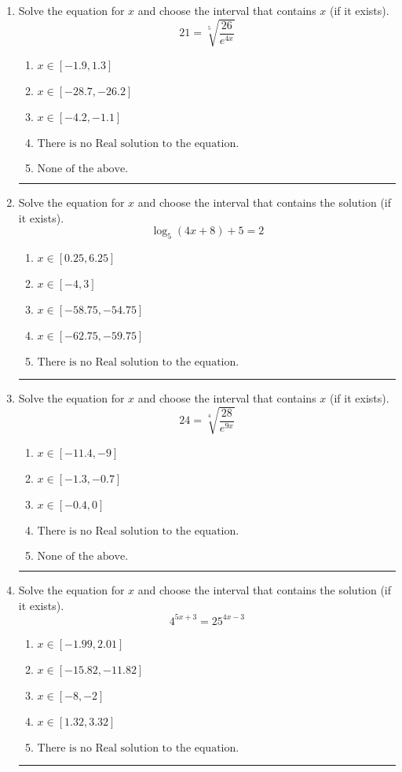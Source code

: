 \documentclass[14pt]{extbook}
\newcommand{\litem}[1]{\item#1\hspace*{-1cm}\rule{\textwidth}{0.4pt}}
\begin{document}
\begin{enumerate}
{\begin{enumerate}[label=\Alph*.]
\end{enumerate} }
\litem{
 Solve the equation for $x$ and choose the interval that contains $x$ (if it exists).\[  21 = \sqrt[5]{\frac{26}{e^{4x}}} \]\begin{enumerate}[label=\Alph*.]
\item \( x \in [-1.9, 1.3] \)
\item \( x \in [-28.7, -26.2] \)
\item \( x \in [-4.2, -1.1] \)
\item \( \text{There is no Real solution to the equation.} \)
\item \( \text{None of the above.} \)

\end{enumerate} }
\litem{
Solve the equation for $x$ and choose the interval that contains the solution (if it exists).\[ \log_{5}{(4x+8)}+5 = 2 \]\begin{enumerate}[label=\Alph*.]
\item \( x \in [0.25, 6.25] \)
\item \( x \in [-4, 3] \)
\item \( x \in [-58.75, -54.75] \)
\item \( x \in [-62.75, -59.75] \)
\item \( \text{There is no Real solution to the equation.} \)

\end{enumerate} }
\litem{
 Solve the equation for $x$ and choose the interval that contains $x$ (if it exists).\[  24 = \sqrt[4]{\frac{28}{e^{9x}}} \]\begin{enumerate}[label=\Alph*.]
\item \( x \in [-11.4, -9] \)
\item \( x \in [-1.3, -0.7] \)
\item \( x \in [-0.4, 0] \)
\item \( \text{There is no Real solution to the equation.} \)
\item \( \text{None of the above.} \)

\end{enumerate} }
\litem{
Solve the equation for $x$ and choose the interval that contains the solution (if it exists).\[ 4^{5x+3} = 25^{4x-3} \]\begin{enumerate}[label=\Alph*.]
\item \( x \in [-1.99, 2.01] \)
\item \( x \in [-15.82, -11.82] \)
\item \( x \in [-8, -2] \)
\item \( x \in [1.32, 3.32] \)
\item \( \text{There is no Real solution to the equation.} \)


\end{enumerate}}
\end{enumerate}
\end{document}
